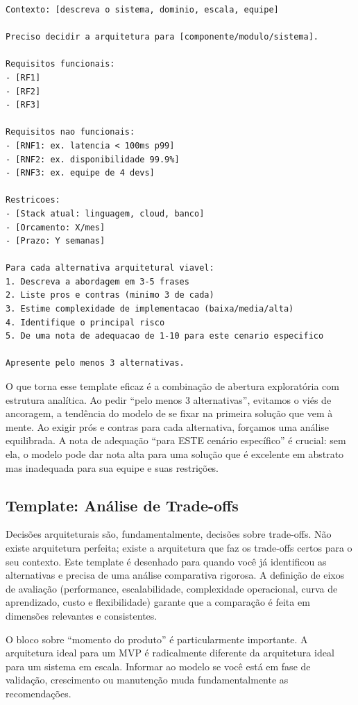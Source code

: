 \begin{lstlisting}[language={}, caption={Prompt para exploração de alternativas arquiteturais}]
Contexto: [descreva o sistema, dominio, escala, equipe]

Preciso decidir a arquitetura para [componente/modulo/sistema].

Requisitos funcionais:
- [RF1]
- [RF2]
- [RF3]

Requisitos nao funcionais:
- [RNF1: ex. latencia < 100ms p99]
- [RNF2: ex. disponibilidade 99.9%]
- [RNF3: ex. equipe de 4 devs]

Restricoes:
- [Stack atual: linguagem, cloud, banco]
- [Orcamento: X/mes]
- [Prazo: Y semanas]

Para cada alternativa arquitetural viavel:
1. Descreva a abordagem em 3-5 frases
2. Liste pros e contras (minimo 3 de cada)
3. Estime complexidade de implementacao (baixa/media/alta)
4. Identifique o principal risco
5. De uma nota de adequacao de 1-10 para este cenario especifico

Apresente pelo menos 3 alternativas.
\end{lstlisting}

O que torna esse template eficaz é a combinação de abertura exploratória com
estrutura analítica. Ao pedir ``pelo menos 3 alternativas'', evitamos o viés de
ancoragem, a tendência do modelo de se fixar na primeira solução que vem à
mente. Ao exigir prós e contras para cada alternativa, forçamos uma análise
equilibrada. A nota de adequação ``para ESTE cenário específico'' é crucial:
sem ela, o modelo pode dar nota alta para uma solução que é excelente em
abstrato mas inadequada para sua equipe e suas restrições.

\subsection{Template: Análise de Trade-offs}

Decisões arquiteturais são, fundamentalmente, decisões sobre trade-offs. Não
existe arquitetura perfeita; existe a arquitetura que faz os trade-offs certos
para o seu contexto. Este template é desenhado para quando você já identificou as
alternativas e precisa de uma análise comparativa rigorosa. A definição de eixos
de avaliação (performance, escalabilidade, complexidade operacional, curva de
aprendizado, custo e flexibilidade) garante que a comparação é feita em dimensões
relevantes e consistentes.

O bloco sobre ``momento do produto'' é particularmente importante. A arquitetura
ideal para um MVP é radicalmente diferente da arquitetura ideal para um sistema em
escala. Informar ao modelo se você está em fase de validação, crescimento ou
manutenção muda fundamentalmente as recomendações.

